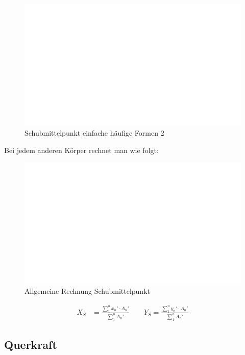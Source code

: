 \begin{figure}[h]
	\centering
	\includegraphics[scale=0.9]{leer.png}
	\caption{Schubmittelpunkt einfache häufige Formen 2}
\end{figure}

\newpage

Bei jedem anderen Körper rechnet man wie folgt:

\begin{figure}[h]
	\centering
	\includegraphics[scale=0.9]{leer.png}
	\caption{Allgemeine Rechnung Schubmittelpunkt}
\end{figure}

\begin{align*}
X_S &= \frac{\sum_{1}^{n} x_n' \cdot A_n'}{\sum_{1}^{n} A_n'} \qquad
Y_S = \frac{\sum_{1}^{n} y_n' \cdot A_n'}{\sum_{1}^{n} A_n'} 
\end{align*}

\subsection*{Querkraft}


